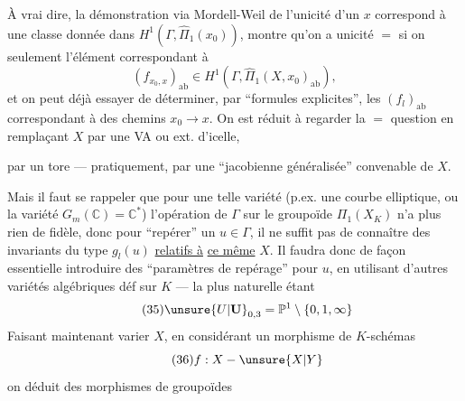 À vrai dire, la démonstration via Mordell-Weil de l'unicité d'un $x$   correspond à une classe donnée dans $H^1(\Gamma,\widehat\Pi_1(x_0))$, montre qu'on a unicité $=$ si on   seulement l'élément correspondant à 
\[
\tag{34}(f_{x_0,x})_{\mathrm{ab}}\in H^1(\Gamma,\widehat\Pi_1(X,x_0)_{\mathrm{ab}}),
\]
et on peut déjà essayer de déterminer, par ``formules explicites'', les $(f_l)_{\mathrm{ab}}$ correspondant à des chemins $x_0\longrightarrow x$. On est réduit à regarder la $=$ question en remplaçant $X$ par une VA ou ext. d'icelle,


par un tore --- pratiquement, par une ``jacobienne généralisée'' convenable de $X$.

Mais il faut se rappeler que pour une telle variété (p.ex. une courbe elliptique, ou la variété $G_m(\mathbb C)=\mathbb C^*$) l'opération de $\Gamma$ sur le groupoïde $\Pi_1(X_K)$ n'a plus rien de fidèle, donc pour ``repérer'' un $u\in\Gamma$, il ne suffit pas de connaître des invariants du type $g_l(u)$ \uline{relatifs à} \uline{ce même} $X$. Il faudra donc de façon essentielle introduire des ``paramètres de repérage'' pour $u$, en utilisant d'autres variétés algébriques déf sur $K$ --- la plus naturelle étant
\[
\tag{35}\unsure{U|\mathbf U}_{0,3}=\mathbb P^1\setminus\{0,1,\infty\}
\]
Faisant maintenant varier $X$, en considérant un morphisme de $K$-schémas
\[
\tag{36}f:X\mathbin{-}\unsure{X|Y}
\]
on déduit des morphismes de groupoïdes

